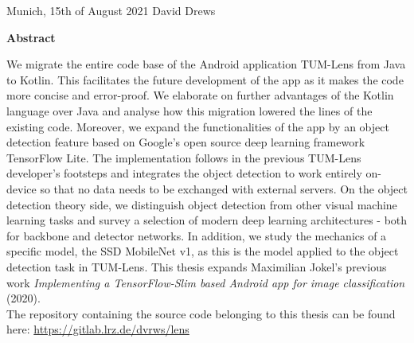 \documentclass[
			   fontsize=11pt,
               paper=a4,
               bibliography=totoc,
               idxtotoc,
               headsepline,
               footsepline,
               footinclude=false,
               BCOR=12mm,
               DIV=13,
               openany,   %
               ]
               {scrbook}
\def\author{David Drews}
\def\date{15th of August 2021}
\begin{document}
\vspace{15mm}
\noindent
Munich, \date \hspace{5cm} \author
\cleardoubleemptypage


{}
\vspace*{2cm}
\begin{center}
    {\Large \textbf {Abstract}}
\end{center}
\vspace{1cm}

We migrate the entire code base of the Android application TUM-Lens from Java to Kotlin. This facilitates the future development of the app as it makes the code more concise and error-proof. We elaborate on further advantages of the Kotlin language over Java and analyse how this migration lowered the lines of the existing code. Moreover, we expand the functionalities of the app by an object detection feature based on Google's open source deep learning framework TensorFlow Lite. The implementation follows in the previous TUM-Lens developer's footsteps and integrates the object detection to work entirely on-device so that no data needs to be exchanged with external servers. On the object detection theory side, we distinguish object detection from other visual machine learning tasks and survey a selection of modern deep learning architectures - both for backbone and detector networks. In addition, we study the mechanics of a specific model, the SSD MobileNet v1, as this is the model applied to the object detection task in TUM-Lens. This thesis expands Maximilian Jokel's previous work \textit{Implementing a TensorFlow-Slim based Android app for image classification} (2020). \\

\noindent The repository containing the source code belonging to this thesis can be found here: \url{https://gitlab.lrz.de/dvrws/lens}

\cleardoublepage

\end{document}
